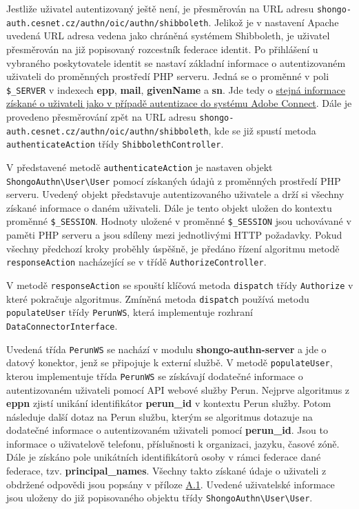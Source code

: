 \documentclass[
  printed, %
  twoside, %
  table,   %
  nolof,     %
  nolot,     %
]{fithesis3}
\begin{document}
Jestliže uživatel autentizovaný ještě není, je přesměrován na URL adresu \texttt{shongo-auth.cesnet.cz/authn/oic/authn/shibboleth}. Jelikož je v nastavení Apache uvedená URL adresa vedena jako chráněná systémem Shibboleth, je uživatel přesměrován na již popisovaný rozcestník federace identit. Po přihlášení u vybraného poskytovatele identit se nastaví základní informace o autentizovaném uživateli do proměnných prostředí PHP serveru. Jedná se o proměnné v poli \texttt{\$\_SERVER} v indexech \textbf{epp}, \textbf{mail}, \textbf{givenName} a \textbf{sn}. Jde tedy o \hyperref[item:adobe-connect]{stejná informace získané o uživateli jako  v případě autentizace do systému Adobe Connect}. Dále je provedeno přesměrování zpět na URL adresu \texttt{shongo-auth.cesnet.cz/authn/oic/authn/shibboleth}, kde se již spustí metoda \texttt{authenticateAction} třídy \texttt{ShibbolethController}. \par

V představené metodě \texttt{authenticateAction} je nastaven objekt \texttt{ShongoAuthn\textbackslash User\textbackslash User} pomocí získaných údajů z proměnných prostředí PHP serveru. Uvedený objekt představuje autentizovaného uživatele a drží si všechny získané informace o daném uživateli. Dále je tento objekt uložen do kontextu proměnné \texttt{\$\_SESSION}. Hodnoty uložené v proměnné \texttt{\$\_SESSION} jsou uchovávané v paměti PHP serveru a jsou sdíleny mezi jednotlivými HTTP požadavky. Pokud všechny předchozí kroky proběhly úspěšně, je předáno řízení algoritmu metodě \texttt{responseAction} nacházející se v třídě \texttt{AuthorizeController}. \par

\label{sec:responseAction}
V metodě \texttt{responseAction} se spouští klíčová metoda \texttt{dispatch} třídy \texttt{Authorize} v které pokračuje algoritmus. Zmíněná metoda \texttt{dispatch} používá metodu \texttt{populateUser} třídy \texttt{PerunWS}, která implementuje rozhraní \texttt{DataConnectorInterface}. \par

Uvedená třída \texttt{PerunWS} se nachází v modulu \textbf{shongo-authn-server} a jde o datový konektor, jenž se připojuje k externí službě. V metodě \texttt{populateUser}, kterou implementuje třída \texttt{PerunWS} se získávají dodatečné informace o autentizovaném uživateli pomocí API webové služby Perun. Nejprve algoritmus z \textbf{eppn} zjistí unikání identifikátor \textbf{perun\_id} v kontextu Perun služby. Potom následuje další dotaz na Perun službu, kterým se algoritmus dotazuje na dodatečné informace o autentizovaném uživateli pomocí \textbf{perun\_id}. Jsou to informace o uživatelově telefonu, příslušnosti k organizaci, jazyku, časové zóně. Dále je získáno pole unikátních identifikátorů osoby v rámci federace dané federace, tzv. \textbf{principal\_names}. Všechny takto získané údaje o uživateli z obdržené odpovědi jsou popsány v příloze \hyperref[table:perunws:user]{A.1}. Uvedené uživatelské informace jsou uloženy do již popisovaného objektu třídy \texttt{ShongoAuthn\textbackslash User\textbackslash User}. \par
\end{document}
